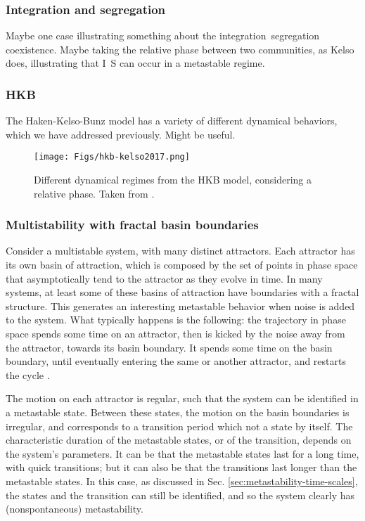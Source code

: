 \documentclass[preprint,superscriptaddress,showpacs,amsmath,amssymb,aps,pre,floatfix]{revtex4-1}
\theoremstyle{definition}
\begin{document}



\subsubsection{Integration and segregation}
Maybe one case illustrating something about the integration~segregation coexistence. Maybe taking the relative phase between two communities, as Kelso does, illustrating that I~S can occur in a metastable regime.


\subsubsection{HKB}
The Haken-Kelso-Bunz model has a variety of different dynamical behaviors, which we have addressed previously. Might be useful. 
%
\begin{figure}[H]
    \centering
    \texttt{[image: Figs/hkb-kelso2017.png]}
    \caption{Different dynamical regimes from the HKB model, considering a relative phase. Taken from \cite{kelso_2017}. }
    \label{fig:hkb}
\end{figure}

\subsubsection{Multistability with fractal basin boundaries}
Consider a multistable system, with many distinct attractors. Each attractor has its own basin of attraction, which is composed by the set of points in phase space that asymptotically tend to the attractor as they evolve in time. 
In many systems, at least some of these basins of attraction have boundaries with a fractal structure. This generates an interesting metastable behavior when noise is added to the system. 
What typically happens is the following: the trajectory in phase space spends some time on an attractor, then is kicked by the noise away from the attractor, towards its basin boundary. It spends some time on the basin boundary, until eventually entering the same or another attractor, and restarts the cycle \cite{feudel_2008}. 

The motion on each attractor is regular, such that the system can be identified in a metastable state. Between these states, the motion on the basin boundaries is irregular, and corresponds to a transition period which not a state by itself. The characteristic duration of the metastable states, or of the transition, depends on the system's parameters. It can be that the metastable states last for a long time, with quick transitions; but it can also be that the transitions last longer than the metastable states. 
In this case, as discussed in Sec. \ref{sec:metastability-time-scales}, the states and the transition can still be identified, and so the system clearly has (nonspontaneous) metastability. 
\end{document}
